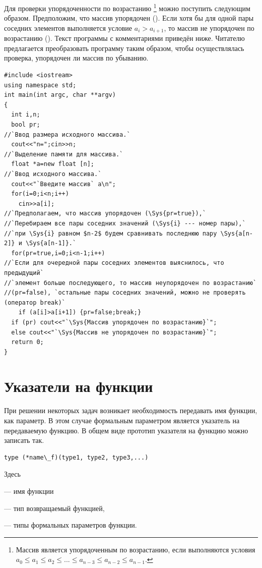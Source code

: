 Для проверки упорядоченности по возрастанию \footnote{Массив является упорядоченным по
возрастанию, если выполняются условия  $a_0\le a_1\le a_2\le ...\le a_{n-3}\le a_{n-2}\le a_{n-1}$.} можно
поступить следующим образом. Предположим, что массив упорядочен (). Если хотя бы для одной
пары соседних элементов выполняется условие $a_i>a_{i+1}$, то массив не упорядочен по возрастанию
(). Текст программы с комментариями приведён ниже. Читателю предлагается преобразовать
программу таким образом, чтобы осуществлялась проверка, упорядочен ли массив по убыванию.
\begin{lstlisting}
#include <iostream>
using namespace std;
int main(int argc, char **argv)
{
  int i,n;
  bool pr;
//`Ввод размера исходного массива.`
  cout<<"n=";cin>>n;
//`Выделение памяти для массива.`
  float *a=new float [n];
//`Ввод исходного массива.`
  cout<<"`Введите массив` a\n";
  for(i=0;i<n;i++)
    cin>>a[i];
//`Предполагаем, что массив упорядочен (\Sys{pr=true}),`
//`Перебираем все пары соседних значений (\Sys{i} --- номер пары),`
//`при \Sys{i} равном $n-2$ будем сравнивать последнюю пару \Sys{a[n-2]} и \Sys{a[n-1]}.`
  for(pr=true,i=0;i<n-1;i++)
//`Если для очередной пары соседних элементов выяснилось, что предыдущий` 
//`элемент больше последующего, то массив неупорядочен по возрастанию` 
//(pr=false), `остальные пары соседних значений, можно не проверять (оператор break)`
    if (a[i]>a[i+1]) {pr=false;break;}
  if (pr) cout<<"`\Sys{Массив упорядочен по возрастанию}`";
  else cout<<"`\Sys{Массив не упорядочен по возрастанию}`";
  return 0;
}
\end{lstlisting}

\section[Указатели на функции]{Указатели на функции}
При решении некоторых задач возникает необходимость передавать имя функции, как параметр. В этом случае формальным
параметром является указатель на передаваемую функцию. В общем виде прототип указателя на функцию можно записать так.
\begin{lstlisting}
type (*name\_f)(type1, type2, type3,...)
\end{lstlisting}
Здесь

 --- имя функции

 --- тип возвращаемый функцией, 

 --- типы формальных параметров функции.

